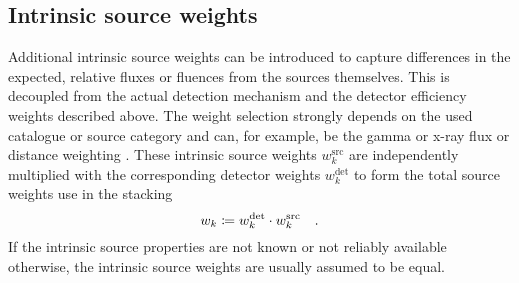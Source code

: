 \subsection{Intrinsic source weights}
Additional intrinsic source weights can be introduced to capture differences in the expected, relative fluxes or fluences from the sources themselves.
This is decoupled from the actual detection mechanism and the detector efficiency weights described above.
The weight selection strongly depends on the used catalogue or source category and can, for example, be the gamma or x-ray flux or distance weighting .
These intrinsic source weights $w_k^\text{src}$ are independently multiplied with the corresponding detector weights $w_k^\text{det}$ to form the total source weights use in the stacking
\begin{equation}
  w_k \coloneqq w_k^\text{det} \cdot w_k^\text{src}
  \quad\text{.}
\end{equation}
If the intrinsic source properties are not known or not reliably available otherwise, the intrinsic source weights are usually assumed to be equal.

